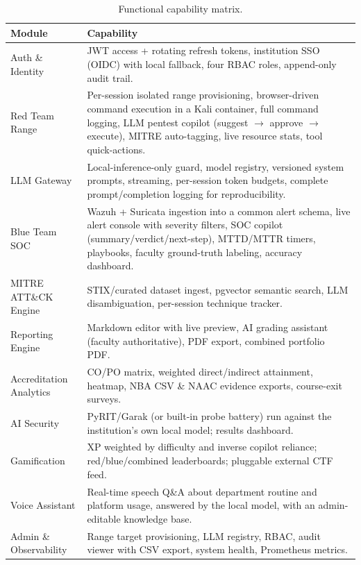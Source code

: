 \documentclass[11pt,a4paper]{article}
\begin{document}
\begin{table}[h]
\centering
\small
\begin{tabular}{@{}p{4.2cm}p{10.5cm}@{}}
\toprule
\textbf{Module} & \textbf{Capability}\\
\midrule
Auth \& Identity & JWT access + rotating refresh tokens, institution SSO (OIDC) with local fallback, four RBAC roles, append-only audit trail.\\
Red Team Range & Per-session isolated range provisioning, browser-driven command execution in a Kali container, full command logging, LLM pentest copilot (suggest $\rightarrow$ approve $\rightarrow$ execute), MITRE auto-tagging, live resource stats, tool quick-actions.\\
LLM Gateway & Local-inference-only guard, model registry, versioned system prompts, streaming, per-session token budgets, complete prompt/completion logging for reproducibility.\\
Blue Team SOC & Wazuh + Suricata ingestion into a common alert schema, live alert console with severity filters, SOC copilot (summary/verdict/next-step), MTTD/MTTR timers, playbooks, faculty ground-truth labeling, accuracy dashboard.\\
MITRE ATT\&CK Engine & STIX/curated dataset ingest, pgvector semantic search, LLM disambiguation, per-session technique tracker.\\
Reporting Engine & Markdown editor with live preview, AI grading assistant (faculty authoritative), PDF export, combined portfolio PDF.\\
Accreditation Analytics & CO/PO matrix, weighted direct/indirect attainment, heatmap, NBA CSV \& NAAC evidence exports, course-exit surveys.\\
AI Security & PyRIT/Garak (or built-in probe battery) run against the institution's own local model; results dashboard.\\
Gamification & XP weighted by difficulty and inverse copilot reliance; red/blue/combined leaderboards; pluggable external CTF feed.\\
Voice Assistant & Real-time speech Q\&A about department routine and platform usage, answered by the local model, with an admin-editable knowledge base.\\
Admin \& Observability & Range target provisioning, LLM registry, RBAC, audit viewer with CSV export, system health, Prometheus metrics.\\
\bottomrule
\end{tabular}
\caption{Functional capability matrix.}
\end{table}
\end{document}
